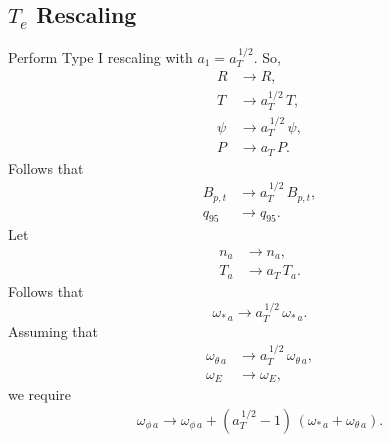 \documentclass[12pt]{article}
\begin{document}
\subsection{$T_e$ Rescaling}
Perform Type I rescaling with $a_1 =a_T^{\,1/2}$. So,
\begin{align}
R&\rightarrow R,\\[0.5ex]
T&\rightarrow a_T^{1/2}\,T,\\[0.5ex]
\psi&\rightarrow a_T^{\,1/2}\,\psi,\\[0.5ex]
P&\rightarrow a_T\,P.
\end{align}
Follows that
\begin{align}
B_{p,t}&\rightarrow a_T^{\,1/2}\,B_{p,t},\\[0.5ex]
q_{95}&\rightarrow q_{95}.
\end{align}
Let
\begin{align}
n_a&\rightarrow n_a,\\[0.5ex]
T_a&\rightarrow a_T\,T_a.
\end{align}
Follows that
\begin{equation}
\omega_{\ast\,a} \rightarrow a_T^{\,1/2}\,\omega_{\ast\,a}.
\end{equation}
Assuming that
\begin{align}
\omega_{\theta\,a}&\rightarrow a_T^{\,1/2}\,\omega_{\theta\,a},\\[0.5ex]
\omega_E&\rightarrow\omega_E,
\end{align}
we require 
\begin{align}
\omega_{\phi\,a}\rightarrow \omega_{\phi\,a}+(a_T^{\,1/2}-1)\,(\omega_{\ast\,a}+\omega_{\theta\,a}).
\end{align}
\end{document}
